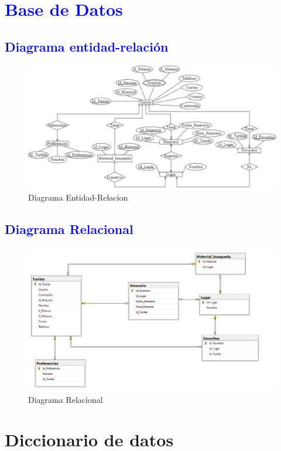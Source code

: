 \newpage
\section{\textcolor{blue}{Base de Datos}}
\subsection{\textcolor{blue}{Diagrama entidad-relación}}
\begin{figure}[h]
    \centering
    \includegraphics[width=1\linewidth]{entregable final/Img_BasesdeDatos/Diagrama.png}
    \caption{Diagrama Entidad-Relacion}
    \label{fig:Diagrama Entidad-Relacion}
\end{figure}

\subsection{\textcolor{blue}{Diagrama Relacional}}
\begin{figure}[h]
    \centering
    \includegraphics[width=0.9\linewidth]{entregable final/Img_BasesdeDatos/image.png}
    \caption{Diagrama Relacional}
    \label{fig:Diagrama Relacional}
\end{figure}
\newpage
\section{{Diccionario de datos}}

